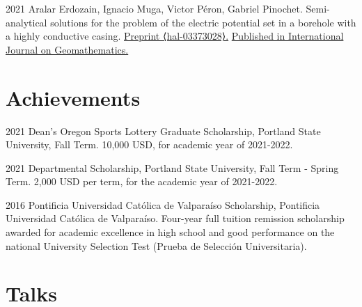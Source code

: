 \documentclass[12pt,letterpaper]{report}
\begin{document}
    \begin{tablist}

    \item[2021] \tab Aralar Erdozain, Ignacio Muga, Victor P\'eron, Gabriel Pinochet. Semi-analytical solutions for the problem of the electric potential set in a borehole with a highly conductive casing. \href{https://hal.archives-ouvertes.fr/hal-03373028}{Preprint ⟨hal-03373028⟩.} \href{https://link.springer.com/article/10.1007/s13137-022-00197-3}{ Published in International Journal on Geomathematics.}

    \end{tablist}

    \section*{Achievements}

    \begin{tablist}

        \item[2021] \tab Dean's Oregon Sports Lottery Graduate Scholarship, Portland State University, Fall Term. 10,000 USD, for academic year of 2021-2022.

        \item[2021] \tab Departmental Scholarship, Portland State University, Fall Term - Spring Term. 2,000 USD per term, for the academic year of 2021-2022.


        \item[2016] \tab Pontificia Universidad Cat\'olica de Valpara\'iso Scholarship, Pontificia Universidad Cat\'olica de Valpara\'iso. Four-year full tuition remission scholarship awarded for academic excellence in high school and good performance on the national University Selection Test (Prueba de Selecci\'on Universitaria).

    \end{tablist}

    \section*{Talks}
\end{document}
